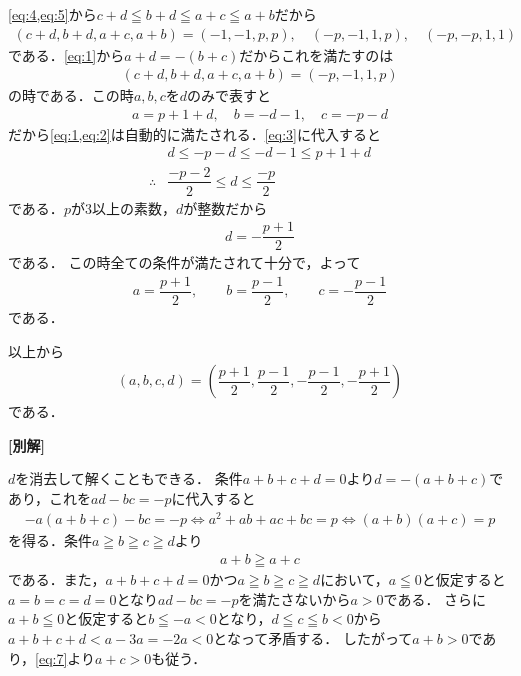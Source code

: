 \documentclass[../../main.tex]{subfiles}
\begin{document}
\cref{eq:4,eq:5}から$c+d\leqq b+d\leqq a+c\leqq a+b$だから
\begin{align}
  (c+d,b+d,a+c,a+b)=(-1,-1,p,p),\quad(-p,-1,1,p),\quad(-p,-p,1,1)
\end{align}
である．\cref{eq:1}から$a+d=-(b+c)$だからこれを満たすのは
\begin{align}
  (c+d,b+d,a+c,a+b) = (-p,-1,1,p) \label{eq:6}
\end{align}
の時である．この時$a,b,c$を$d$のみで表すと
\begin{align}
  a = p+1+d,
  \quad
  b = -d-1,
  \quad
  c = -p-d
\end{align}
だから\cref{eq:1,eq:2}は自動的に満たされる．\cref{eq:3}に代入すると
\begin{align}
  & d \le -p-d \le -d-1 \le p+1+d \\
  \therefore
  & \dfrac{-p-2}{2} \le d \le \dfrac{-p}{2}
\end{align}
である．$p$が$3$以上の素数，$d$が整数だから
\begin{align}
  d = -\dfrac{p+1}{2}
\end{align}
である．
この時全ての条件が満たされて十分で，よって
\begin{align}
  a=\dfrac{p+1}{2},\qquad b=\dfrac{p-1}{2},\qquad c=-\dfrac{p-1}{2}
\end{align}
である．

以上から
\begin{align}
  (a,b,c,d)=\left(\dfrac{p+1}{2},\dfrac{p-1}{2},-\dfrac{p-1}{2},-\dfrac{p+1}{2}\right)
\end{align}
である．

{\bf [別解]}

$d$を消去して解くこともできる．
条件$a+b+c+d=0$より$d=-(a+b+c)$であり，これを$ad-bc=-p$に代入すると
\begin{align}
  -a(a+b+c)-bc = -p
  \iff a^2+ab+ac+bc = p
  \iff (a+b)(a+c) = p \label{eq:7}
\end{align}
を得る．条件$a \geqq b \geqq c \geqq d$より
\begin{align}
  a+b \geqq a+c
\end{align}
である．また，$a+b+c+d=0$かつ$a \geqq b \geqq c \geqq d$において，$a \leqq 0$と仮定すると$a=b=c=d=0$となり$ad-bc=-p$を満たさないから$a>0$である．
さらに$a+b \leqq 0$と仮定すると$b \leqq -a < 0$となり，$d \leqq c \leqq b < 0$から$a+b+c+d < a - 3a = -2a < 0$となって矛盾する．
したがって$a+b > 0$であり，\cref{eq:7}より$a+c > 0$も従う．
\end{document}
